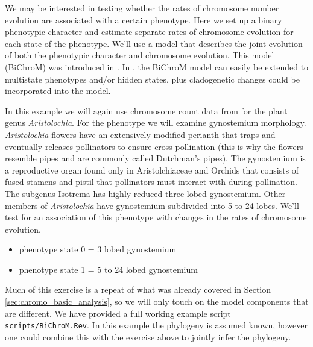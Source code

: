 We may be interested in testing whether the rates of chromosome number evolution
are associated with a certain phenotype.
Here we set up a binary phenotypic character and estimate separate rates of chromosome
evolution for each state of the phenotype. 
We'll use a model that describes the joint evolution of both the
phenotypic character and chromosome evolution. This model (BiChroM) was introduced in \citet{zenil2017testing}. In \RevBayes, the BiChroM model can easily be extended to multistate phenotypes and/or 
hidden states, plus cladogenetic changes could be incorporated into the model.

In this example we will again use chromosome count data from \citet{ohi2006molecular} for the plant 
genus \textit{Aristolochia}. 
For the phenotype we will examine gynostemium morphology. \textit{Aristolochia} flowers have an extensively 
modified perianth that traps and eventually releases pollinators to ensure cross pollination 
(this is why the flowers resemble pipes and are commonly called Dutchman's pipes). The gynostemium 
is a reproductive organ found only in Aristolchiaceae and Orchids that consists of fused stamens 
and pistil that pollinators must interact with during pollination. The subgenus Isotrema has highly
reduced three-lobed gynostemium. Other members of \textit{Aristolochia} have gynostemium subdivided into
5 to 24 lobes. We'll test for an association of this phenotype with changes in the rates of 
chromosome evolution. 
\begin{itemize}
\item phenotype state 0 = 3 lobed gynostemium
\item phenotype state 1 = 5 to 24 lobed gynostemium
\end{itemize}
Much of this exercise is a repeat of what was already covered in Section \ref{sec:chromo_basic_analysis},
so we will only touch on the model components that are different.
We have provided a full working example script \texttt{scripts/BiChroM.Rev}.
In this example the phylogeny is assumed known, however one could combine this with the exercise above
to jointly infer the phylogeny.

\begin{figure}[h!]
\label{fig:bichrom_rates}
\end{figure}

